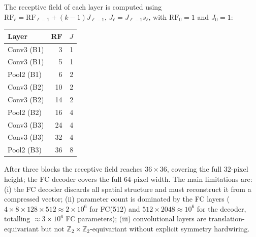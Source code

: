 \documentclass[conference,compsoc]{IEEEtran}
\begin{document}
The receptive field of each layer is computed using $\mathrm{RF}_\ell = \mathrm{RF}_{\ell-1} + (k-1)J_{\ell-1}$, $J_\ell = J_{\ell-1}s_\ell$, with $\mathrm{RF}_0=1$ and $J_0=1$:

\begin{center}
\small
\begin{tabular}{@{}lrr@{}}
\toprule
Layer & RF & $J$ \\
\midrule
Conv3 (B1) &  3 & 1 \\
Conv3 (B1) &  5 & 1 \\
Pool2 (B1) &  6 & 2 \\
Conv3 (B2) & 10 & 2 \\
Conv3 (B2) & 14 & 2 \\
Pool2 (B2) & 16 & 4 \\
Conv3 (B3) & 24 & 4 \\
Conv3 (B3) & 32 & 4 \\
Pool2 (B3) & 36 & 8 \\
\bottomrule
\end{tabular}
\end{center}

After three blocks the receptive field reaches $36\times36$, covering the full $32$-pixel height; the FC decoder covers the full $64$-pixel width. The main limitations are: (i) the FC decoder discards all spatial structure and must reconstruct it from a compressed vector; (ii) parameter count is dominated by the FC layers ($4{\times}8{\times}128{\times}512\approx2{\times}10^6$ for FC(512) and $512{\times}2048\approx10^6$ for the decoder, totalling $\approx3{\times}10^6$ FC parameters); (iii) convolutional layers are translation-equivariant but not $\mathbb{Z}_2\times\mathbb{Z}_2$-equivariant without explicit symmetry hardwiring.
\end{document}
